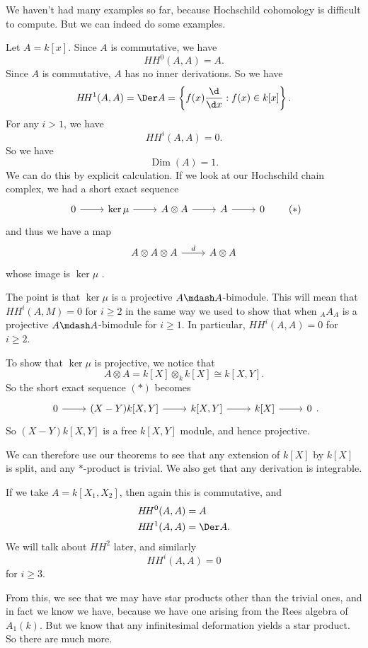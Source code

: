 \documentclass[a4paper]{article}
\DeclareMathOperator\Dim{Dim}
\newcommand\HH{H\!H}
\begin{document}
We haven't had many examples so far, because Hochschild cohomology is difficult to compute. But we can indeed do some examples.
\begin{eg}
  Let $A = k[x]$. Since $A$ is commutative, we have
  \[
    \HH^0(A, A) = A.
  \]
  Since $A$ is commutative, $A$ has no inner derivations. So we have
  \[
    \HH^1(A, A) = \Der A = \left\{f(x) \frac{\d}{\d x}: f(x) \in k[x]\right\}.
  \]
  For any $i > 1$, we have
  \[
    \HH^i(A, A) = 0.
  \]
  So we have
  \[
    \Dim(A) = 1.
  \]
  We can do this by explicit calculation. If we look at our Hochschild chain complex, we had a short exact sequence
  \[
    \begin{tikzcd}
      0 \ar[r] & \ker \mu \ar[r] & A \otimes A \ar[r] & A \ar[r] & 0
    \end{tikzcd}\tag{$*$}
  \]
  and thus we have a map
  \[
    \begin{tikzcd}
      A \otimes A \otimes A \ar[r, "d"] & A \otimes A
    \end{tikzcd}
  \]
  whose image is $\ker \mu$ .

  The point is that $\ker \mu$ is a projective $A\mdash A$-bimodule. This will mean that $\HH^i(A, M) = 0$ for $i \geq 2$ in the same way we used to show that when $_AA_A$ is a projective $A\mdash A$-bimodule for $i \geq 1$. In particular, $\HH^i(A, A) = 0$ for $i \geq 2$.

  To show that $\ker \mu$ is projective, we notice that
  \[
    A \otimes A = k[X] \otimes_k k[X] \cong k[X, Y].
  \]
  So the short exact sequence $(*)$ becomes
  \[
    \begin{tikzcd}
      0 \ar[r] & (X - Y)k[X, Y] \ar[r] & k[X, Y] \ar[r] & k[X] \ar[r] & 0
    \end{tikzcd}.
  \]
  So $(X - Y)k[X, Y]$ is a free $k[X, Y]$ module, and hence projective.

  We can therefore use our theorems to see that any extension of $k[X]$ by $k[X]$ is split, and any $*$-product is trivial. We also get that any derivation is integrable.
\end{eg}

\begin{eg}
  If we take $A = k[X_1, X_2]$, then again this is commutative, and
  \begin{align*}
    \HH^0(A, A) &= A\\
    \HH^1(A, A) &= \Der A.
  \end{align*}
  We will talk about $\HH^2$ later, and similarly
  \[
    \HH^i(A, A) = 0
  \]
  for $i \geq 3$.
\end{eg}
From this, we see that we may have star products other than the trivial ones, and in fact we know we have, because we have one arising from the Rees algebra of $A_1(k)$. But we know that any infinitesimal deformation yields a star product. So there are much more.
\end{document}
